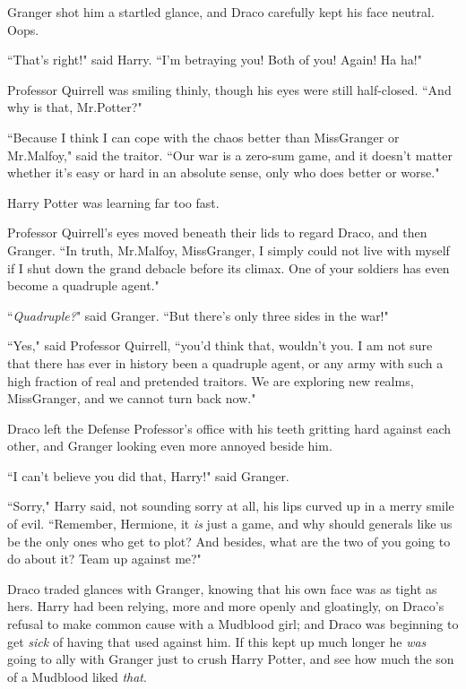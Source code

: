 Granger shot him a startled glance, and Draco carefully kept his face neutral. Oops.

``That's right!" said Harry. ``I'm betraying you! Both of you! Again! Ha ha!"

Professor Quirrell was smiling thinly, though his eyes were still half-closed. ``And why is that, Mr.\?Potter?"

``Because I think I can cope with the chaos better than Miss\?Granger or Mr.\?Malfoy," said the traitor. ``Our war is a zero-sum game, and it doesn't matter whether it's easy or hard in an absolute sense, only who does better or worse."

Harry Potter was learning far too fast.

Professor Quirrell's eyes moved beneath their lids to regard Draco, and then Granger. ``In truth, Mr.\?Malfoy, Miss\?Granger, I simply could not live with myself if I shut down the grand debacle before its climax. One of your soldiers has even become a quadruple agent."

``\emph{Quadruple?}" said Granger. ``But there's only three sides in the war!"

``Yes," said Professor Quirrell, ``you'd think that, wouldn't you. I am not sure that there has ever in history been a quadruple agent, or any army with such a high fraction of real and pretended traitors. We are exploring new realms, Miss\?Granger, and we cannot turn back now."

Draco left the Defense Professor's office with his teeth gritting hard against each other, and Granger looking even more annoyed beside him.

``I can't believe you did that, Harry!" said Granger.

``Sorry," Harry said, not sounding sorry at all, his lips curved up in a merry smile of evil. ``Remember, Hermione, it \emph{is} just a game, and why should generals like us be the only ones who get to plot? And besides, what are the two of you going to do about it? Team up against me?"

Draco traded glances with Granger, knowing that his own face was as tight as hers. Harry had been relying, more and more openly and gloatingly, on Draco's refusal to make common cause with a Mudblood girl; and Draco was beginning to get \emph{sick} of having that used against him. If this kept up much longer he \emph{was} going to ally with Granger just to crush Harry Potter, and see how much the son of a Mudblood liked \emph{that}.

\later

